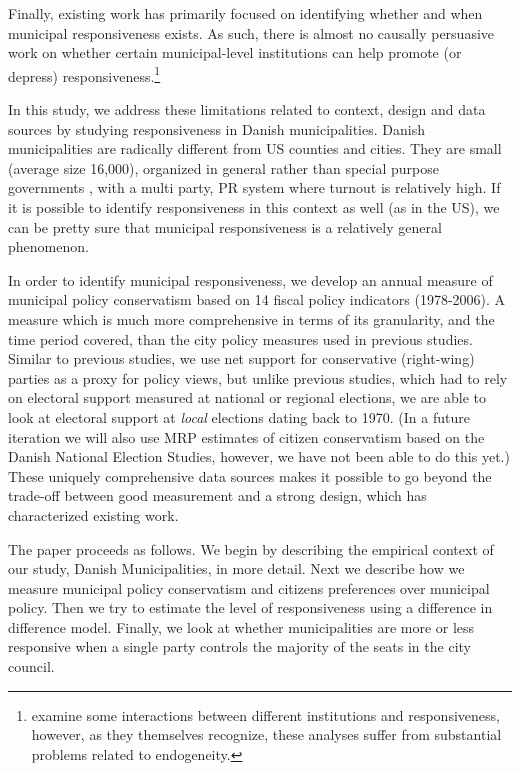 \documentclass[a4paper,12pt]{article}
\begin{document}
Finally, existing work has primarily focused on identifying whether and when municipal responsiveness exists. As such, there is almost no causally persuasive work on whether certain municipal-level institutions can help promote (or depress) responsiveness.\footnote{\cite{tausanovitch2014representation} examine some interactions between different institutions and responsiveness, however, as they themselves recognize, these analyses suffer from substantial problems related to endogeneity.} 

In this study, we address these limitations related to context, design and data sources by studying responsiveness in Danish municipalities. Danish municipalities are radically different from US counties and cities. They are small (average size 16,000), organized in general rather than special purpose governments \citep{berry2009imperfect}, with a multi party, PR system where turnout is relatively high. If it is possible to identify responsiveness in this context as well (as in the US), we can be pretty sure that municipal responsiveness is a relatively general phenomenon.

In order to identify municipal responsiveness, we develop an annual measure of municipal policy conservatism based on 14 fiscal policy indicators (1978-2006). A measure which is much more comprehensive in terms of its granularity, and the time period covered, than the city policy measures used in previous studies. Similar to previous studies, we use net support for conservative (right-wing) parties as a proxy for policy views, but unlike previous studies, which had to rely on electoral support measured at national or regional elections, we are able to look at electoral support at \textit{local} elections dating back to 1970. (In a future iteration we will also use MRP estimates of citizen conservatism based on the Danish National Election Studies, however, we have not been able to do this yet.) These uniquely comprehensive data sources makes it possible to go beyond the trade-off between good measurement and a strong design, which has characterized existing work. 

The paper proceeds as follows. We begin by describing the empirical context of our study, Danish Municipalities, in more detail. Next we describe how we measure municipal policy conservatism and citizens preferences over municipal policy. Then we try to estimate the level of responsiveness using a difference in difference model. Finally, we look at whether municipalities are more or less responsive when a single party controls the majority of the seats in the city council.
\end{document}
